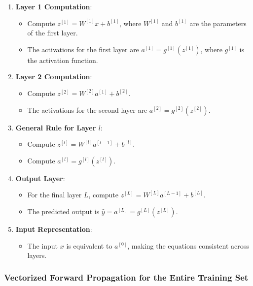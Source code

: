 \documentclass[letterpaper,12pt,notitlepage,twoside]{report}
\begin{document}
\begin{enumerate}
    \item \textbf{Layer 1 Computation}:
    \begin{itemize}
        \item Compute \( z^{[1]} = W^{[1]} x + b^{[1]} \), where \( W^{[1]} \) and \( b^{[1]} \) are the parameters of the first layer.
        \item The activations for the first layer are \( a^{[1]} = g^{[1]}(z^{[1]}) \), where \( g^{[1]} \) is the activation function.
    \end{itemize}
    
    \item \textbf{Layer 2 Computation}:
    \begin{itemize}
        \item Compute \( z^{[2]} = W^{[2]} a^{[1]} + b^{[2]} \).
        \item The activations for the second layer are \( a^{[2]} = g^{[2]}(z^{[2]}) \).
    \end{itemize}
    
    \item \textbf{General Rule for Layer \( l \)}:
    \begin{itemize}
        \item Compute \( z^{[l]} = W^{[l]} a^{[l-1]} + b^{[l]} \).
        \item Compute \( a^{[l]} = g^{[l]}(z^{[l]}) \).
    \end{itemize}
    
    \item \textbf{Output Layer}:
    \begin{itemize}
        \item For the final layer \( L \), compute \( z^{[L]} = W^{[L]} a^{[L-1]} + b^{[L]} \).
        \item The predicted output is \( \hat{y} = a^{[L]} = g^{[L]}(z^{[L]}) \).
    \end{itemize}
    
    \item \textbf{Input Representation}:
    \begin{itemize}
        \item The input \( x \) is equivalent to \( a^{[0]} \), making the equations consistent across layers.
    \end{itemize}
\end{enumerate}

\subsubsection{Vectorized Forward Propagation for the Entire Training Set}
\end{document}
